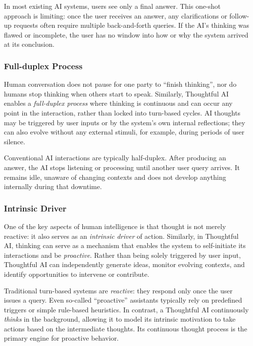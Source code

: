 In most existing AI systems, users see only a final answer. This one-shot approach is limiting: once the user receives an answer, any clarifications or follow-up requests often require multiple back-and-forth queries. If the AI’s thinking was flawed or incomplete, the user has no window into how or why the system arrived at its conclusion.


\subsubsection{Full-duplex Process}
Human conversation does not pause for one party to ``finish thinking'', nor do humans stop thinking when others start to speak. Similarly, Thoughtful AI enables a \textit{full-duplex process} where thinking is continuous and can occur any point in the interaction, rather than locked into turn-based cycles. AI thoughts may be triggered by user inputs or by the system’s own internal reflections; they can also evolve without any external stimuli, for example, during periods of user silence.

Conventional AI interactions are typically half-duplex. After producing an answer, the AI stops listening or processing until another user query arrives. It remains idle, unaware of changing contexts and does not develop anything internally during that downtime.


\subsubsection{Intrinsic Driver}
One of the key aspects of human intelligence is that thought is not merely reactive: it also serves as an \textit{intrinsic driver} of action. Similarly, in Thoughtful AI, thinking can serve as a mechanism that enables the system to self-initiate its interactions and be \textit{proactive}.
Rather than being solely triggered by user input, Thoughtful AI can independently generate ideas, monitor evolving contexts, and identify opportunities to intervene or contribute.

Traditional turn-based systems are \emph{reactive}: they respond only once the user issues a query. Even so-called ``proactive'' assistants typically rely on predefined triggers or simple rule-based heuristics. In contrast, a Thoughtful AI continuously \emph{thinks} in the background, allowing it to model its intrinsic motivation to take actions based on the intermediate thoughts. Its continuous thought process is the primary engine for proactive behavior.

